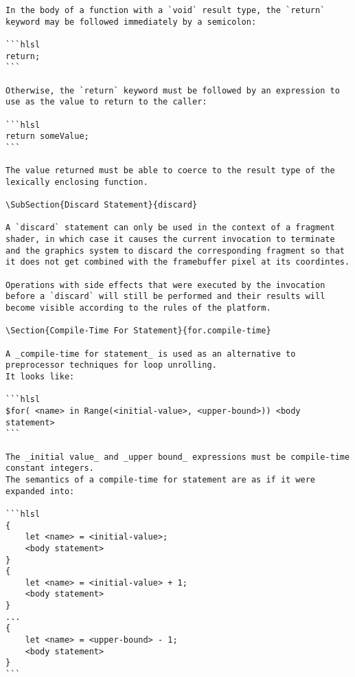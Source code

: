 \begin{verbatim}
In the body of a function with a `void` result type, the `return` keyword may be followed immediately by a semicolon:

```hlsl
return;
```

Otherwise, the `return` keyword must be followed by an expression to use as the value to return to the caller:

```hlsl
return someValue;
```

The value returned must be able to coerce to the result type of the lexically enclosing function.

\SubSection{Discard Statement}{discard}

A `discard` statement can only be used in the context of a fragment shader, in which case it causes the current invocation to terminate and the graphics system to discard the corresponding fragment so that it does not get combined with the framebuffer pixel at its coordintes.

Operations with side effects that were executed by the invocation before a `discard` will still be performed and their results will become visible according to the rules of the platform.

\Section{Compile-Time For Statement}{for.compile-time}

A _compile-time for statement_ is used as an alternative to preprocessor techniques for loop unrolling.
It looks like:

```hlsl
$for( <name> in Range(<initial-value>, <upper-bound>)) <body statement>
```

The _initial value_ and _upper bound_ expressions must be compile-time constant integers.
The semantics of a compile-time for statement are as if it were expanded into:

```hlsl
{
	let <name> = <initial-value>;
	<body statement>
}
{
	let <name> = <initial-value> + 1;
	<body statement>
}
...
{
	let <name> = <upper-bound> - 1;
	<body statement>
}
```

\end{verbatim}